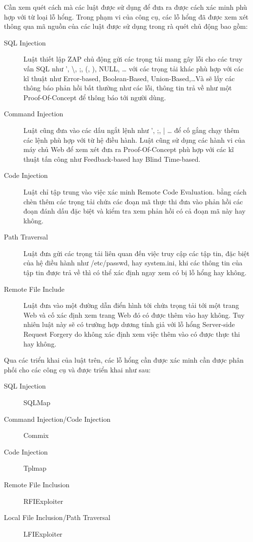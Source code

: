 \documentclass[./../main.tex]{subfiles}
\begin{document}
Cần xem quét cách mà các luật được sử dụng để đưa ra được cách xác minh phù
hợp với từ loại lỗ hổng. Trong phạm vi của công cụ, các lỗ hổng đã được
xem xét thông qua mã nguồn của các luật được sử dụng trong rà quét chủ động
bao gồm:
\begin{description}
	\item[SQL Injection] Luật thiết lập ZAP chủ động gửi các trọng tải mang
	      gây lỗi cho các truy vấn SQL như ', \textbackslash, ;, (, ), NULL, \ldots
	      với các trọng tải khác phù hợp với các kĩ thuật như Error-based, Boolean-Based,
	      Union-Based,\ldots Và sẽ lấy các thông báo phản hồi bất thường như
	      các lỗi, thông tin trả về như một Proof-Of-Concept để thông báo tới
	      người dùng.
	\item[Command Injection] Luật cũng đưa vào các dấu ngắt lệnh như ', ;, | \ldots
	      để cố gắng chạy thêm các lệnh phù hợp với từ hệ điều hành. Luật cũng
	      sử dụng các hành vi của máy chủ Web để xem xét đưa ra Proof-Of-Concept
	      phù hợp với các kĩ thuật tấn công như Feedback-based hay Blind Time-based.
	\item[Code Injection] Luật chỉ tập trung vào việc xác minh Remote Code Evaluation.
	      bằng cách chèn thêm các trọng tải chứa các đoạn mã thực thi đưa
	      vào phản hồi các đoạn đánh dấu đặc biệt và kiểm tra xem phản hồi
	      có cả đoạn mã này hay không.
	\item[Path Traversal] Luật đưa gửi các trọng tải liên quan đến việc truy
	      cập các tập tin, đặc biệt của hệ điều hành như /etc/passwd, hay system.ini,
	      khi các thông tin của tập tin được trả về thì có thể xác định ngay xem
	      có bị lỗ hổng hay không.
	\item[Remote File Include] Luật đưa vào một đường dẫn điển hình tới
	      chứa trọng tải tới một trang Web và cố xác định xem trang Web đó có được
	      thêm vào hay không. Tuy nhiên luật này sẽ có trường hợp dương tính giả
	      với lỗ hổng Server-side Request Forgery do không xác định xem việc
	      thêm vào có được thực thi hay không.

\end{description}


Qua các triển khai của luật trên, các lỗ hổng cần được xác minh cần được
phân phối cho các công cụ và được triển khai như sau:
\begin{description}
	\item[SQL Injection] SQLMap
	\item [Command Injection/Code Injection] Commix
	\item [Code Injection] Tplmap
	\item [Remote File Inclusion] RFIExploiter
	\item [Local File Inclusion/Path Traversal] LFIExploiter
\end{description}
\end{document}

